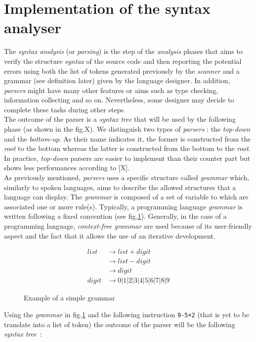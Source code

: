 \documentclass[a4paper,11pt]{article}
\begin{document}
\section{Implementation of the syntax analyser}
  The \textit{syntax analysis} (or \textit{parsing}) is the step of the \textit{analysis} phases that aims to verify the structure \textit{syntax} of the source code and then reporting the potential errors using both the list of tokens generated previously by the \textit{scanner} and a grammar (see definition later) given by the language designer. In addition, \textit{parsers} might have many other features or aims such as type checking, information collecting and so on. Nevertheless, some designer may decide to complete these tasks during other steps.\\
  The outcome of the parser is a \textit{syntax tree} that will be used by the following phase (as shown in the fig.X). We distinguish two types of \textit{parsers} : the \textit{top-down} and the \textit{bottom-up}. As their name indicates it, the former is constructed from the \textit{root} to the bottom whereas the latter is constructed from the bottom to the \textit{root}. In practice, \textit{top-down} parsers are easier to implement than their counter part but shows less performances according to [X].\\
  As previously mentioned, \textit{parsers} uses a specific structure called \textit{grammar} which, similarly to spoken languages, aims to describe the allowed structures that a language can display.%
  The \textit{grammar} is composed of a set of variable to which are associated one or more rule(s). Typically, a programming language \textit{grammar} is written following a fixed convention (see fig.\ref{example:grammar}). Generally, in the case of a programming language, \textit{context-free grammar} are used because of its user-friendly aspect and the fact that it allows the use of an iterative development.
  \begin{figure}[h!]
    \begin{align*}
      list  &\rightarrow list + digit \\
            &\rightarrow list - digit \\
            &\rightarrow digit \\
      digit &\rightarrow 0|1|2|3|4|5|6|7|8|9
    \end{align*}
    \caption{Example of a simple grammar}
    \label{example:grammar}
  \end{figure}
  Using the \textit{grammar} in fig.\ref{example:grammar} and the following instruction \verb|9-5+2| (that is yet to be translate into a list of token) the outcome of the parser will be the following \textit{syntax tree}~:\\
\end{document}
